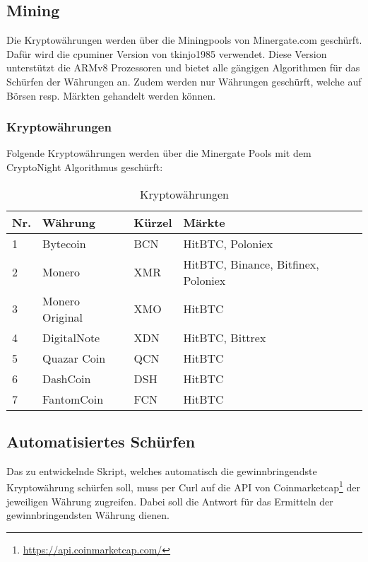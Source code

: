 \subsection{Mining}
Die Kryptowährungen werden über die Miningpools von Minergate.com geschürft. Dafür wird die cpuminer Version von tkinjo1985 verwendet. Diese Version unterstützt die ARMv8 Prozessoren und bietet alle gängigen Algorithmen für das Schürfen der Währungen an.
Zudem werden nur Währungen geschürft, welche auf Börsen resp. Märkten gehandelt werden können.


\subsubsection{Kryptowährungen}
Folgende Kryptowährungen werden über die Minergate Pools mit dem CryptoNight Algorithmus geschürft:

\begin{table}[H]
\centering
\begin{tabular}{p{1cm}p{3.5cm}p{2cm}p{9.5cm}}
\hline
\rowcolor{heading} \textbf{Nr.} & \textbf{Währung} & \textbf{Kürzel} &\textbf{Märkte } \\\hline
1 & Bytecoin & BCN & HitBTC, Poloniex \\\hline
2 & Monero & XMR & HitBTC, Binance, Bitfinex, Poloniex \\\hline
3 & Monero Original & XMO & HitBTC \\\hline
4 & DigitalNote & XDN & HitBTC, Bittrex \\\hline
5 & Quazar Coin & QCN & HitBTC \\\hline
6 & DashCoin & DSH & HitBTC \\\hline
7 & FantomCoin & FCN & HitBTC \\\hline
\end{tabular}
\caption{Kryptowährungen}
\end{table}


\subsection{Automatisiertes Schürfen}
Das zu entwickelnde Skript, welches automatisch die gewinnbringendste Kryptowährung schürfen soll, muss per Curl auf  die API von Coinmarketcap\footnote{\url{https://api.coinmarketcap.com/}} der jeweiligen Währung zugreifen. Dabei soll die Antwort für das Ermitteln der gewinnbringendsten Währung dienen.